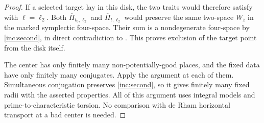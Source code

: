 \begin{proof}
If a selected target lay in this disk, the two traits would
therefore satisfy  with $\ell=\ell_2$.
Both $\overline\Pi_{t_0,\ell_2}$ and
$\overline\Pi_{t,\ell_2}$ would preserve the same two-space
$W_{\bar z}$ in the marked symplectic four-space.  Their sum
is a nondegenerate four-space by \eqref{inc:second}, in direct
contradiction to .  This proves exclusion
of the target point from the disk itself.

The center has only finitely many non-potentially-good places,
and the fixed data have only finitely many conjugates.  Apply
the argument at each of them.  Simultaneous conjugation preserves
\eqref{inc:second}, so it gives finitely many fixed radii with
the asserted properties.  All of this argument uses integral
models and prime-to-characteristic torsion.  No comparison with
de Rham horizontal transport at a bad center is needed.
\end{proof}
